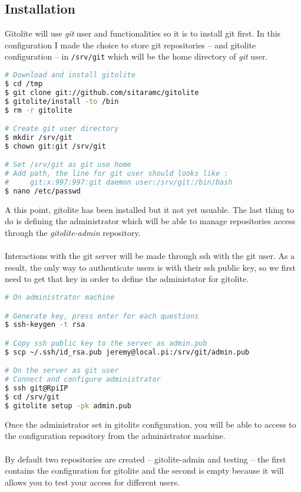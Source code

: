 \subsection{Installation}

Gitolite will use \emph{git} user and functionalities so it is 
to install git first. In this configuration I made the choice to 
store git repositories -- and gitolite configuration -- in 
\texttt{/srv/git} which will be the home directory of \emph{git} 
user.

\begin{lstlisting}[language=bash,caption=Gitolite installation]
# Download and install gitolite
$ cd /tmp
$ git clone git://github.com/sitaramc/gitolite
$ gitolite/install -to /bin
$ rm -r gitolite

# Create git user directory
$ mkdir /srv/git
$ chown git:git /srv/git

# Set /srv/git as git use home
# Add path, the line for git user should looks like :
#     git:x:997:997:git daemon user:/srv/git:/bin/bash
$ nano /etc/passwd
\end{lstlisting}

A this point, gitolite has been installed but it not yet usuable. 
The last thing to do is defining the administrator which will be able 
to manage repositories access through the \emph{gitolite-admin} 
repository.
\\\\
Interactions with the git server will be made through ssh with the 
git user. As a result, the only way to authenticate users is with 
their ssh public key, so we first need to get that key in order 
to define the administator for gitolite.

\begin{lstlisting}[language=bash,caption=Get ssh public key and define gitolite administrator]
# On administrator machine

# Generate key, press enter for each questions
$ ssh-keygen -t rsa

# Copy ssh public key to the server as admin.pub
$ scp ~/.ssh/id_rsa.pub jeremy@local.pi:/srv/git/admin.pub

# On the server as git user
# Connect and configure administrator
$ ssh git@RpiIP
$ cd /srv/git
$ gitolite setup -pk admin.pub
\end{lstlisting}

Once the administrator set in gitolite configuration, you will be able to access 
to the configuration repository from the administrator machine. 
\\\\
By default two repositories are created -- gitolite-admin and testing -- the 
first contains the configuration for gitolite and the second is empty because it 
will allows you to test your access for different users.
 
